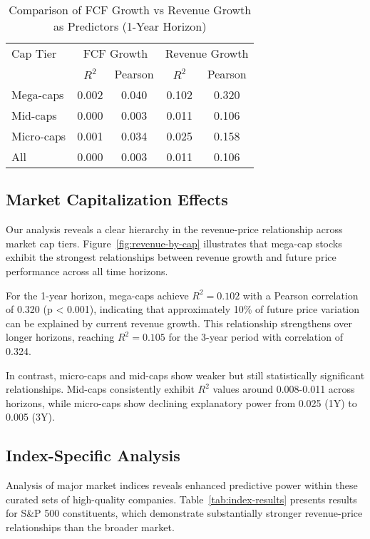 \documentclass[11pt]{article}
\begin{document}
\begin{table}[!htbp]
\centering
\caption{Comparison of FCF Growth vs Revenue Growth as Predictors (1-Year Horizon)}
\label{tab:fcf-vs-revenue}
\begin{tabular}{lcccc}
\toprule
Cap Tier & \multicolumn{2}{c}{FCF Growth} & \multicolumn{2}{c}{Revenue Growth} \\
\cmidrule(r){2-3} \cmidrule(l){4-5}
 & $R^2$ & Pearson & $R^2$ & Pearson \\
\midrule
Mega-caps & 0.002 & 0.040 & 0.102 & 0.320 \\
Mid-caps  & 0.000 & 0.003 & 0.011 & 0.106 \\
Micro-caps & 0.001 & 0.034 & 0.025 & 0.158 \\
All & 0.000 & 0.003 & 0.011 & 0.106 \\
\bottomrule
\end{tabular}
\end{table}

\vspace{1em}
\FloatBarrier

\subsection{Market Capitalization Effects}

Our analysis reveals a clear hierarchy in the revenue-price relationship across market cap tiers. Figure~\ref{fig:revenue-by-cap} illustrates that mega-cap stocks exhibit the strongest relationships between revenue growth and future price performance across all time horizons.

For the 1-year horizon, mega-caps achieve $R^2 = 0.102$ with a Pearson correlation of 0.320 (p < 0.001), indicating that approximately 10\% of future price variation can be explained by current revenue growth. This relationship strengthens over longer horizons, reaching $R^2 = 0.105$ for the 3-year period with correlation of 0.324.

In contrast, micro-caps and mid-caps show weaker but still statistically significant relationships. Mid-caps consistently exhibit $R^2$ values around 0.008-0.011 across horizons, while micro-caps show declining explanatory power from 0.025 (1Y) to 0.005 (3Y).

\subsection{Index-Specific Analysis}

Analysis of major market indices reveals enhanced predictive power within these curated sets of high-quality companies. Table~\ref{tab:index-results} presents results for S\&P 500 constituents, which demonstrate substantially stronger revenue-price relationships than the broader market.
\end{document}
